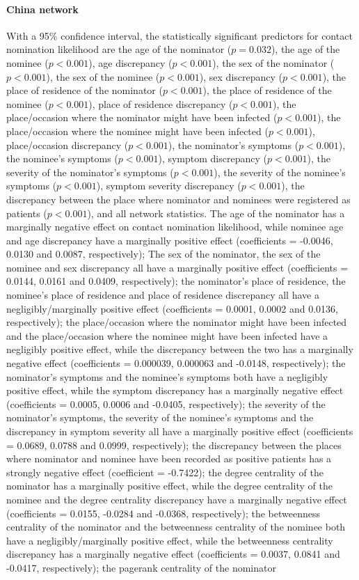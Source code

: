 \paragraph{China network} With a 95\% confidence interval, the statistically significant predictors for contact nomination likelihood are the age of the nominator ($p=0.032$), the age of the nominee ($p<0.001$), age discrepancy ($p<0.001$), the sex of the nominator ($p<0.001$), the sex of the nominee ($p<0.001$), sex discrepancy ($p<0.001$), the place of residence of the nominator ($p<0.001$), the place of residence of the nominee ($p<0.001$), place of residence discrepancy ($p<0.001$), the place/occasion where the nominator might have been infected ($p<0.001$), the place/occasion where the nominee might have been infected ($p<0.001$), place/occasion discrepancy ($p<0.001$), the nominator's symptoms ($p<0.001$), the nominee's symptoms ($p<0.001$), symptom discrepancy ($p<0.001$), the severity of the nominator's symptoms ($p<0.001$), the severity of the nominee's symptoms ($p<0.001$), symptom severity discrepancy ($p<0.001$), the discrepancy between the place where nominator and nominees were registered as patients ($p<0.001$), and all network statistics. The age of the nominator has a marginally negative effect on contact nomination likelihood, while nominee age and age discrepancy have a marginally positive effect (coefficients = -0.0046, 0.0130 and 0.0087, respectively); The sex of the nominator, the sex of the nominee and sex discrepancy all have a marginally positive effect (coefficients = 0.0144, 0.0161 and 0.0409, respectively); the nominator's place of residence, the nominee's place of residence and place of residence discrepancy all have a negligibly/marginally positive effect (coefficients = 0.0001, 0.0002 and 0.0136, respectively); the place/occasion where the nominator might have been infected and the place/occasion where the nominee might have been infected have a negligibly positive effect, while the discrepancy between the two has a marginally negative effect (coefficients = 0.000039, 0.000063 and -0.0148, respectively); the nominator's symptoms and the nominee's symptoms both have a negligibly positive effect, while the symptom discrepancy has a marginally negative effect (coefficients = 0.0005, 0.0006 and -0.0405, respectively); the severity of the nominator's symptoms, the severity of the nominee's symptoms and the discrepancy in symptom severity all have a marginally positive effect (coefficients = 0.0689, 0.0788 and 0.0999, respectively); the discrepancy between the places where nominator and nominee have been recorded as positive patients has a strongly negative effect (coefficient = -0.7422); the degree centrality of the nominator has a marginally positive effect, while the degree centrality of the nominee and the degree centrality discrepancy have a marginally negative effect (coefficients = 0.0155, -0.0284 and -0.0368, respectively); the betweenness centrality of the nominator and the betweenness centrality of the nominee both have a negligibly/marginally positive effect, while the betweenness centrality discrepancy has a marginally negative effect (coefficients = 0.0037, 0.0841 and -0.0417, respectively); the pagerank centrality of the nominator 